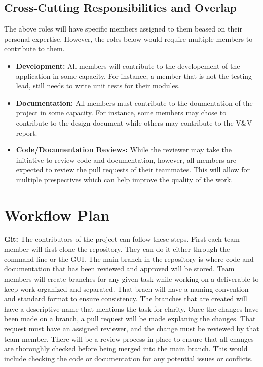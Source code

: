 \documentclass{article}
\begin{document}
\subsection*{Cross-Cutting Responsibilities and Overlap} 

The above roles will have specific members assigned to them beased on their personal expertise. However, the roles below would require multiple members to contribute to them. 
\begin{itemize}
  \item {\bf Development:} All members will contribute to the developement of the application in some capacity. For instance, a member that is not the testing lead, still needs to write unit tests for their modules. 
  \item {\bf Documentation:} All members must contribute to the doumentation of the project in some capacity. For instance, some members may chose to contribute to the design document while others may contribute to the V\&V report.
  \item {\bf Code/Documentation Reviews:} While the reviewer may take the initiative to review code and documentation, however, all members are expected to review the pull requests of their teammates. This will allow for multiple prespectives which can help improve the quality of the work. 
\end{itemize}


\section{Workflow Plan}

{\bf Git:} The contributors of the project can follow these steps. First each team member will first clone the repository. They can do it either through the command line or the GUI. The main branch in the repository is where code and documentation that has been reviewed and approved will be stored. 
Team members will create branches for any given task while working
on a deliverable to keep work organized and separated. That brach will have a naming convention and standard format to ensure consistency. The branches that are created will have a descriptive name that mentions the task for clarity. Once the changes have been made on a branch, 
a pull request will be made explaning the changes. That request must have an assigned reviewer, and the change must be reviewed by that team member. There will be a review process in place to ensure that all changes are thoroughly checked before being merged into the main branch. 
This would include checking the code or documentation for any potential issues or conflicts. \\
\end{document}
